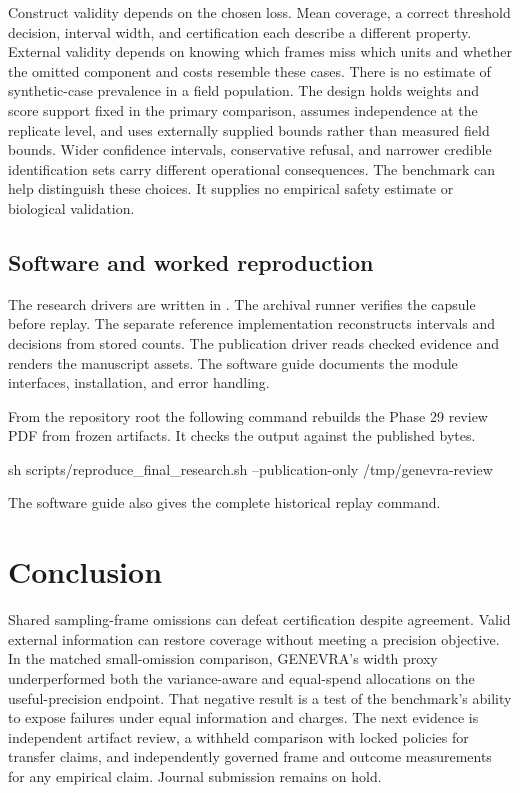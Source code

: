 \documentclass[article,nojss]{jss}
\begin{document}
Construct validity depends on the chosen loss. Mean coverage, a correct
threshold decision, interval width, and certification each describe a
different property. External validity depends on knowing which frames
miss which units and whether the omitted component and costs resemble
these cases. There is no estimate of synthetic-case prevalence in a
field population. The design holds weights and score support fixed in
the primary comparison, assumes independence at the replicate level, and
uses externally supplied bounds rather than measured field bounds. Wider
confidence intervals, conservative refusal, and narrower credible
identification sets carry different operational consequences. The
benchmark can help distinguish these choices. It supplies no empirical
safety estimate or biological validation.

\subsection{Software and worked reproduction}
The  research drivers are written in . The archival
runner verifies the capsule before replay. The separate reference implementation reconstructs intervals and decisions
from stored counts. The publication
driver reads checked evidence and renders the manuscript assets. The software
guide documents the module interfaces, installation, and error handling.

From the repository root the following command rebuilds the Phase 29 review PDF
from frozen artifacts. It checks the output against the published bytes.
\begin{Code}
sh scripts/reproduce_final_research.sh --publication-only /tmp/genevra-review
\end{Code}
The software guide also gives the complete historical replay command.

\section{Conclusion}

Shared sampling-frame omissions can defeat certification despite
agreement. Valid external information can restore coverage without
meeting a precision objective. In the matched small-omission comparison,
GENEVRA's width proxy underperformed both the variance-aware and
equal-spend allocations on the useful-precision endpoint. That negative
result is a test of the benchmark's ability to expose failures under
equal information and charges. The next evidence is independent artifact
review, a withheld comparison with locked policies for transfer claims,
and independently governed frame and outcome measurements for any
empirical claim. Journal submission remains on hold.

\clearpage

\end{document}
